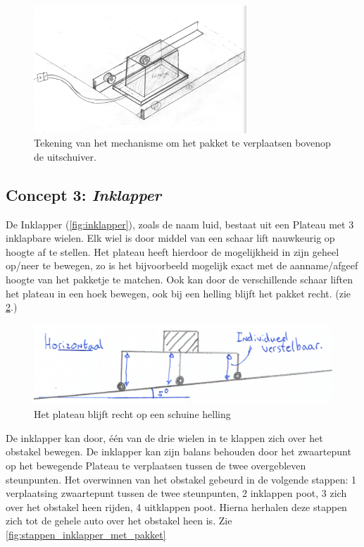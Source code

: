 \begin{figure}[H]
    \centering
    \includegraphics[width=80mm]{04_idee_ontwikkeling/detail_uitschuiver.png}
    \caption{Tekening van het mechanisme om het pakket te verplaatsen bovenop de uitschuiver.}
    \label{fig:detail_uitschuiver}
\end{figure}


\subsection{Concept 3: \textit{Inklapper}}
\label{se:inklapper}
\vspace{\baselineskip}
De Inklapper (\cref{fig:inklapper}), zoals de naam luid, bestaat uit een Plateau met 3 inklapbare wielen. Elk wiel is door middel van een schaar lift nauwkeurig op hoogte af te stellen. Het plateau heeft hierdoor de mogelijkheid in zijn geheel op/neer te bewegen, zo is het bijvoorbeeld mogelijk exact met de aanname/afgeef hoogte van het pakketje te matchen. Ook kan door de verschillende schaar liften het plateau in een hoek bewegen, ook bij een helling blijft het pakket recht. (zie \cref{fig:rechtplateau_op_helling}.)

\begin{figure}[H]
    \centering
    \includegraphics[width=120mm]{04_idee_ontwikkeling/Recht_onder_hoek_driepoten.png}
    \caption{Het plateau blijft recht op een schuine helling}
    \label{fig:rechtplateau_op_helling}
\end{figure}

De inklapper kan door, één van de drie wielen in te klappen zich over het obstakel bewegen. De inklapper kan zijn balans behouden door het zwaartepunt op het bewegende Plateau te verplaatsen tussen de twee overgebleven steunpunten. Het overwinnen van het obstakel gebeurd in de volgende stappen: 1 verplaatsing zwaartepunt tussen de twee steunpunten, 2 inklappen poot, 3 zich over het obstakel heen rijden, 4 uitklappen poot. Hierna herhalen deze stappen zich tot de gehele auto over het obstakel heen is. Zie \cref{fig:stappen_inklapper_met_pakket} \\


